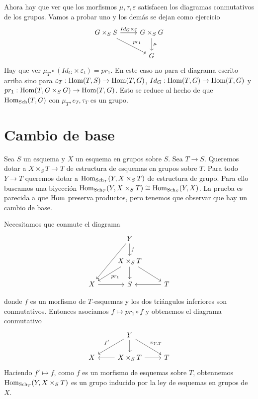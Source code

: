 \documentclass[GA.tex]{subfiles}
\begin{document}
\begin{dem}
Ahora hay que ver que los morfismos $\mu,\tau,\varepsilon$ satisfacen los diagramas conmutativos de los grupos. Vamos a probar uno y los demás se dejan como ejercicio
\[
\begin{tikzcd}
G\times_S S\arrow[r, "Id_G\times\varepsilon"]\arrow[dr, "pr_1"] & G\times_S G\arrow[d,"\mu"]\\
& G
\end{tikzcd}
\]
Hay que ver $\mu_T\circ(Id_G\times\varepsilon_t)=pr_1$. En este caso no para el diagrama escrito arriba sino para $\varepsilon_T:\operatorname{Hom}(T,S)\to\operatorname{Hom}(T,G)$, $Id_G:\operatorname{Hom}(T,G)\to\operatorname{Hom}(T,G)$ y $pr_1:\operatorname{Hom}(T,G\times_S G)\to \operatorname{Hom}(T,G)$. Esto se reduce al hecho de que $\operatorname{Hom}_{\operatorname{Sch}}(T,G)$ con $\mu_T,e_T,\tau_T$ es un grupo. 
\end{dem}

\section{Cambio de base}

Sea $S$ un esquema y $X$ un esquema en grupos sobre $S$. Sea $T\to S$. Queremos dotar a $X\times_S T\to T$ de estructura de esquemas en grupos sobre $T$. Para todo $Y\to T$ queremos dotar a $\operatorname{Hom}_{\operatorname{Sch}_T}(Y,X\times_S T)$ de estructura de grupo. Para ello buscamos una biyección $\operatorname{Hom}_{\operatorname{Sch}_T}(Y,X\times_S T)\cong\operatorname{Hom}_{\operatorname{Sch}_S}(Y,X)$. La prueba es parecida a que $\operatorname{Hom}$ preserva productos, pero tenemos que observar que hay un cambio de base. 

Necesitamos que conmute el diagrama
\[
\begin{tikzcd}
 & Y \arrow[d, "f"] \arrow[ldd] &  \\
 & X\times_S T \arrow[d] \arrow[ld, "pr_1"] \arrow[rd] &  \\
X \arrow[r] & S & T \arrow[l]
\end{tikzcd}
\]

donde $f$ es un morfismo de $T$-esquemas y los dos triángulos inferiores son conmutativos. Entonces asociamos $f\mapsto pr_1\circ f$ y obtenemos el diagrama conmutativo
\[
\begin{tikzcd}
 & Y \arrow[d] \arrow[ld, "f'"'] \arrow[rd, "{\pi_{Y,T}}"] &  \\
X & X\times_S T \arrow[l] \arrow[r] & T
\end{tikzcd}
\]
Haciendo $f'\mapsto f$, como $f$ es un morfismo de esquemas sobre $T$, obtennemos $\operatorname{Hom}_{\operatorname{Sch}_T}(Y,X\times_S T)$ es un grupo inducido por la ley de esquemas en grupos de $X$. 
\end{document}
